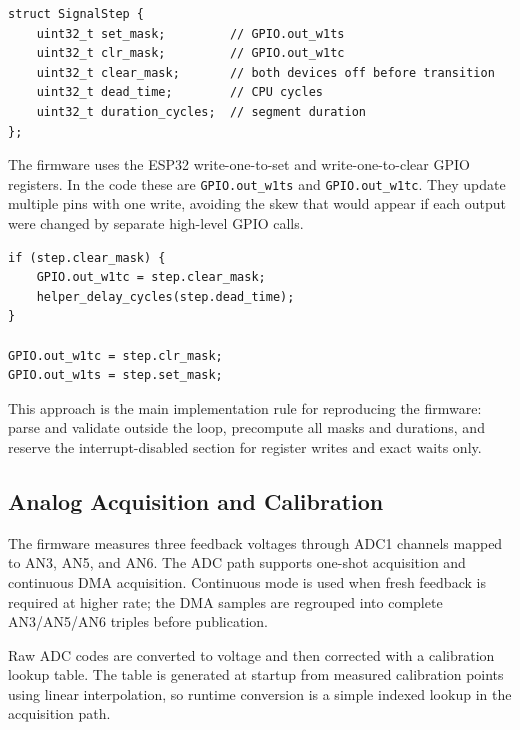 \begin{listing}[H]
\caption{Precomputed step used by the playback loop}
\label{lst:signal-step}
\begin{verbatim}
struct SignalStep {
    uint32_t set_mask;         // GPIO.out_w1ts
    uint32_t clr_mask;         // GPIO.out_w1tc
    uint32_t clear_mask;       // both devices off before transition
    uint32_t dead_time;        // CPU cycles
    uint32_t duration_cycles;  // segment duration
};
\end{verbatim}
\end{listing}

The firmware uses the ESP32 write-one-to-set and write-one-to-clear GPIO registers.
In the code these are \verb|GPIO.out_w1ts| and \verb|GPIO.out_w1tc|. They update
multiple pins with one write, avoiding the skew that would appear if each output were
changed by separate high-level GPIO calls.

\begin{listing}[H]
\caption{Atomic GPIO transition with dead-time}
\label{lst:switching}
\begin{verbatim}
if (step.clear_mask) {
    GPIO.out_w1tc = step.clear_mask;
    helper_delay_cycles(step.dead_time);
}

GPIO.out_w1tc = step.clr_mask;
GPIO.out_w1ts = step.set_mask;
\end{verbatim}
\end{listing}

This approach is the main implementation rule for reproducing the firmware: parse and
validate outside the loop, precompute all masks and durations, and reserve the
interrupt-disabled section for register writes and exact waits only.

\subsection{Analog Acquisition and Calibration}

The firmware measures three feedback voltages through ADC1 channels mapped to AN3,
AN5, and AN6. The ADC path supports one-shot acquisition and continuous DMA
acquisition. Continuous mode is used when fresh feedback is required at higher rate;
the DMA samples are regrouped into complete AN3/AN5/AN6 triples before publication.

Raw ADC codes are converted to voltage and then corrected with a calibration lookup
table. The table is generated at startup from measured calibration points using linear
interpolation, so runtime conversion is a simple indexed lookup in the acquisition
path.

